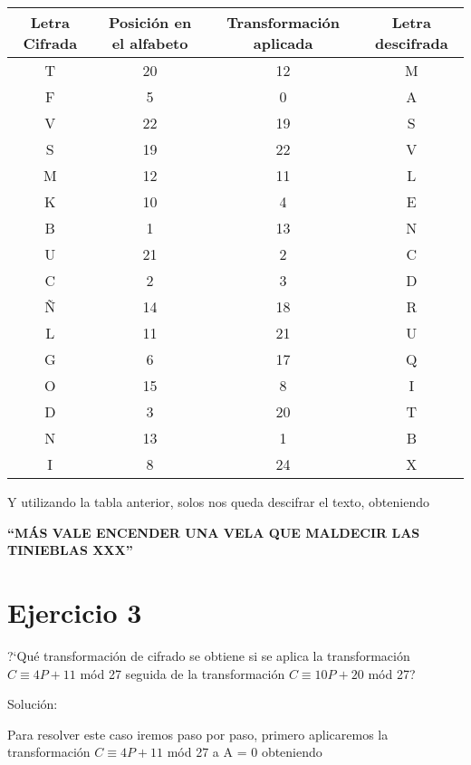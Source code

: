 \documentclass[12pt]{article}
\begin{document}
\begin{center}
    \begin{tabular}{|c|c|c|c|}
        \hline
            Letra Cifrada & Posición en el alfabeto & Transformación aplicada & Letra descifrada \\
        \hline            
            T &  20 & 12 & M \\
            F &  5 & 0 & A \\
            V &  22 & 19 & S \\
            S &  19 & 22 & V \\
            M &  12 & 11 & L \\
            K &  10 & 4 & E \\
            B &  1 & 13 & N \\
            U &  21 & 2 & C \\
            C &  2 & 3 & D \\
            Ñ &  14 & 18 & R \\
            L &  11 & 21 & U \\
            G &  6 & 17 & Q \\
            O &  15 & 8 & I \\
            D &  3 & 20 & T \\
            N &  13 & 1 & B \\
            I &  8 & 24 & X \\
        \hline
    \end{tabular}
\end{center}


Y utilizando la tabla anterior, solos nos queda descifrar el texto, obteniendo 

\begin{center}
    \textbf{
        “MÁS VALE  ENCENDER UNA VELA QUE MALDECIR LAS TINIEBLAS XXX”
    }
\end{center}

\section{Ejercicio 3}
    ?`Qué transformación de cifrado se obtiene si se aplica la transformación $C \equiv 4P + 11$ mód 27 seguida de la transformación $C \equiv 10P + 20$ mód 27?

\par Solución:

Para resolver este caso iremos paso por paso, primero aplicaremos la transformación $C \equiv 4P + 11$ mód 27 a A = 0 obteniendo 
\end{document}

